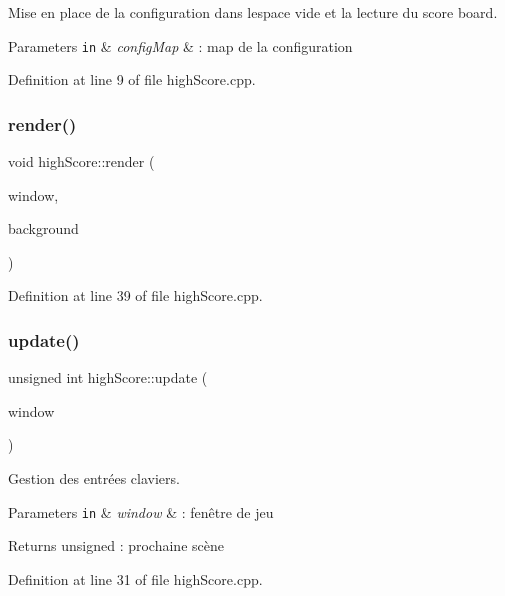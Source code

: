 Mise en place de la configuration dans l\textquotesingle{}espace vide et la lecture du score board. 


\begin{DoxyParams}[1]{Parameters}
\mbox{\tt in}  & {\em config\+Map} & \+: map de la configuration \\
\hline
\end{DoxyParams}


Definition at line 9 of file high\+Score.\+cpp.

\mbox{\label{namespacehigh_score_ae5948b376db24ab12e060a5d679ff9c8}} 
\subsubsection{\texorpdfstring{render()}{render()}}
{\footnotesize\ttfamily void high\+Score\+::render (\begin{DoxyParamCaption}\item[{\hyperlink{class_min_g_l}{Min\+GL} \&}]{window,  }\item[{\hyperlink{classns_gui_1_1_sprite}{ns\+Gui\+::\+Sprite} \&}]{background }\end{DoxyParamCaption})}



Definition at line 39 of file high\+Score.\+cpp.

\mbox{\label{namespacehigh_score_a60c5c3618740163b7a61fe9fbabaedc0}} 
\subsubsection{\texorpdfstring{update()}{update()}}
{\footnotesize\ttfamily unsigned int high\+Score\+::update (\begin{DoxyParamCaption}\item[{\hyperlink{class_min_g_l}{Min\+GL} \&}]{window }\end{DoxyParamCaption})}



Gestion des entrées claviers. 


\begin{DoxyParams}[1]{Parameters}
\mbox{\tt in}  & {\em window} & \+: fenêtre de jeu \\
\hline
\end{DoxyParams}
\begin{DoxyReturn}{Returns}
unsigned \+: prochaine scène 
\end{DoxyReturn}


Definition at line 31 of file high\+Score.\+cpp.

